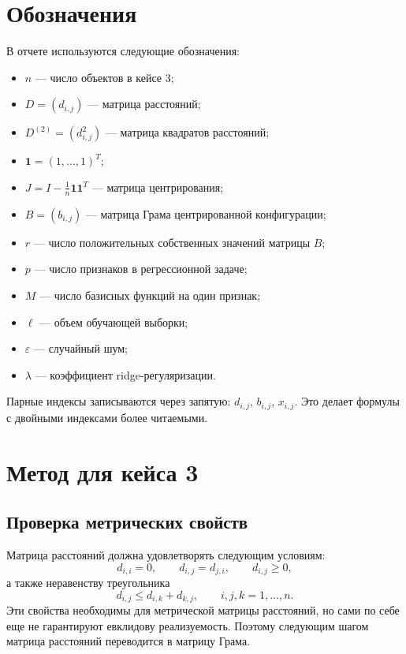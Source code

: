 \documentclass[12pt,a4paper]{article}
\newcommand{\one}{\mathbf{1}}
\newcommand{\eps}{\varepsilon}
\begin{document}
\section{Обозначения}

В отчете используются следующие обозначения:
\begin{itemize}
    \item \(n\) --- число объектов в кейсе 3;
    \item \(D=(d_{i,j})\) --- матрица расстояний;
    \item \(D^{(2)}=(d_{i,j}^2)\) --- матрица квадратов расстояний;
    \item \(\one=(1,\ldots,1)^{T}\);
    \item \(J=I-\frac{1}{n}\one\one^{T}\) --- матрица центрирования;
    \item \(B=(b_{i,j})\) --- матрица Грама центрированной конфигурации;
    \item \(r\) --- число положительных собственных значений матрицы \(B\);
    \item \(p\) --- число признаков в регрессионной задаче;
    \item \(M\) --- число базисных функций на один признак;
    \item \(\ell\) --- объем обучающей выборки;
    \item \(\eps\) --- случайный шум;
    \item \(\lambda\) --- коэффициент ridge-регуляризации.
\end{itemize}

Парные индексы записываются через запятую: \(d_{i,j}\), \(b_{i,j}\),
\(x_{i,j}\). Это делает формулы с двойными индексами более читаемыми.

\section{Метод для кейса 3}

\subsection{Проверка метрических свойств}

Матрица расстояний должна удовлетворять следующим условиям:
\[
    d_{i,i}=0,\qquad
    d_{i,j}=d_{j,i},\qquad
    d_{i,j}\ge 0,
\]
а также неравенству треугольника
\[
    d_{i,j}\le d_{i,k}+d_{k,j},
    \qquad i,j,k=1,\ldots,n.
\]
Эти свойства необходимы для метрической матрицы расстояний, но сами по себе
еще не гарантируют евклидову реализуемость. Поэтому следующим шагом матрица
расстояний переводится в матрицу Грама.
\end{document}
